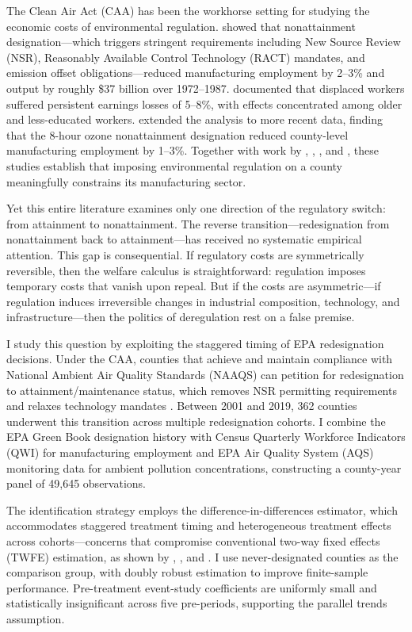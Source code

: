 \documentclass[12pt]{article}
\begin{document}
The Clean Air Act (CAA) has been the workhorse setting for studying the economic costs of environmental regulation. \citet{Greenstone2002} showed that nonattainment designation---which triggers stringent requirements including New Source Review (NSR), Reasonably Available Control Technology (RACT) mandates, and emission offset obligations---reduced manufacturing employment by 2--3\% and output by roughly \$37 billion over 1972--1987. \citet{Walker2013} documented that displaced workers suffered persistent earnings losses of 5--8\%, with effects concentrated among older and less-educated workers. \citet{Curtis2018} extended the analysis to more recent data, finding that the 8-hour ozone nonattainment designation reduced county-level manufacturing employment by 1--3\%. Together with work by \citet{Henderson1996}, \citet{BermanBui2001}, \citet{Greenstone2004}, and \citet{List2003}, these studies establish that imposing environmental regulation on a county meaningfully constrains its manufacturing sector.

Yet this entire literature examines only one direction of the regulatory switch: from attainment to nonattainment. The reverse transition---redesignation from nonattainment back to attainment---has received no systematic empirical attention. This gap is consequential. If regulatory costs are symmetrically reversible, then the welfare calculus is straightforward: regulation imposes temporary costs that vanish upon repeal. But if the costs are asymmetric---if regulation induces irreversible changes in industrial composition, technology, and infrastructure---then the politics of deregulation rest on a false premise.

I study this question by exploiting the staggered timing of EPA redesignation decisions. Under the CAA, counties that achieve and maintain compliance with National Ambient Air Quality Standards (NAAQS) can petition for redesignation to attainment/maintenance status, which removes NSR permitting requirements and relaxes technology mandates \citep{Revesz2016}. Between 2001 and 2019, 362 counties underwent this transition across multiple redesignation cohorts. I combine the EPA Green Book designation history with Census Quarterly Workforce Indicators (QWI) for manufacturing employment and EPA Air Quality System (AQS) monitoring data for ambient pollution concentrations, constructing a county-year panel of 49,645 observations.

The identification strategy employs the \citet{Callaway2021} difference-in-differences estimator, which accommodates staggered treatment timing and heterogeneous treatment effects across cohorts---concerns that compromise conventional two-way fixed effects (TWFE) estimation, as shown by \citet{GoodmanBacon2021}, \citet{deChaisemartin2020}, and \citet{SunAbraham2021}. I use never-designated counties as the comparison group, with doubly robust estimation to improve finite-sample performance. Pre-treatment event-study coefficients are uniformly small and statistically insignificant across five pre-periods, supporting the parallel trends assumption.
\end{document}
